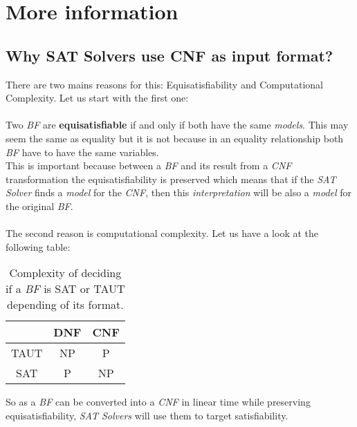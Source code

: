 
\chapter{More information} %

\label{AppendixA} %

\section{Why SAT Solvers use CNF as input format?}
\label{A.1}

There are two mains reasons for this: Equisatisfiability and Computational Complexity. Let us start with the first one: \\\\

Two \emph{BF} are \textbf{equisatisfiable} if and only if both have the same \emph{models}. This may seem the same as equality but it is not because in an equality relationship both \emph{BF} have to have the same variables. \\
This is important because between a \emph{BF} and its result from a \emph{CNF} transformation the equisatisfiability is preserved which means that if the \emph{SAT Solver} finds a \emph{model} for the \emph{CNF}, then this \emph{interpretation} will be also a \emph{model} for the original \emph{BF}.\\\\

The second reason is computational complexity. Let us have a look at the following table:

\begin{table}[h]
	\centering
	\begin{tabular}{c|c|c|}
		\cline{2-3}
		& DNF & CNF \\ \hline\hline
		\multicolumn{1}{|c||}{TAUT} & NP  & P   \\ \hline
		\multicolumn{1}{|c||}{SAT}  & P   & NP  \\ \hline
	\end{tabular}
	\caption{Complexity of deciding if a \emph{BF} is SAT or TAUT depending of its format.}
	\label{my-label}
\end{table}


So as a \emph{BF} can be converted into a \emph{CNF} in linear time while preserving equisatisfiability, \emph{SAT Solvers} will use them to target satisfiability.
%
